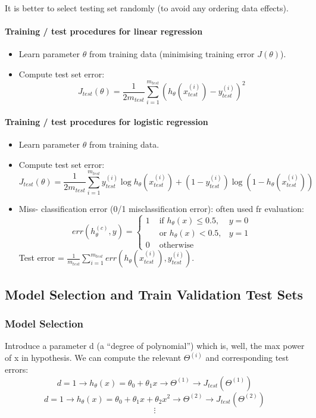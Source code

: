 \documentclass{scrartcl}
\begin{document}
It is better to select testing set randomly (to avoid any ordering
data effects).

\paragraph{Training / test procedures for linear regression}
\label{sec:10-2-1}
\begin{itemize}
\item Learn parameter $\theta$ from training data (minimising training
  error $J(\theta)$).
\item Compute test set error:
\[J_{test}(\theta) = \frac{1}{2m_{test}}\sum \limits_{i=1}^{m_{test}}
  \left(h_\theta(x_{test}^{(i)}) - y_{test}^{(i)} \right)^2  \]
\end{itemize}

\paragraph{Training / test procedures for logistic regression}
\label{sec:10-2-2}
\begin{itemize}
\item Learn parameter $\theta$ from training data.
\item Compute test set error:
\[J_{test}(\theta) = \frac{1}{2m_{test}}\sum \limits_{i=1}^{m_{test}}
  y_{test}^{(i)} \log h_\theta(x_{test}^{(i)}) + (1 - y_{test}^{(i)})
  \log (1 - h_\theta (x_{test}^{(i)}))  \]
\item Miss- classification error (0/1 misclassification error): often
  used fr evaluation: \[
err(h_\theta^{(c)}, y) = \left\{ \begin{array}
    {lll} 1 & \textrm{ if } h_\theta(x) \leq 0.5, & y = 0  \\
& \textrm{ or } h_\theta(x) < 0.5, & y = 1  \\
0   & \textrm{ otherwise } & 
  \end{array} \right.\]
Test error = $\frac{1}{m_{test}} \sum \limits_{i=1}^{m_{test}}
err(h_\theta(x_{test}^{(i)}), y_{test}^{(i)})$.
\end{itemize}

\subsection{Model Selection and Train Validation Test Sets}
\label{sec:10-3}

\subsubsection{Model Selection}
Introduce a parameter d (a ``degree of polynomial'') which is, well,
the max power of x in hypothesis. We can compute the relevant
$\Theta^{(i)}$ and corresponding test errors:
\[ d = 1 \rightarrow h_\theta(x) = \theta_0 + \theta_1x \rightarrow
\Theta^{(1)} \rightarrow J_{test}(\Theta^{(1)}) \] 
\[ d = 1 \rightarrow h_\theta(x) = \theta_0 + \theta_1x + \theta_2x^2 \rightarrow
\Theta^{(2)} \rightarrow J_{test}(\Theta^{(2)}) \] 
\[ \vdots\]
\end{document}
